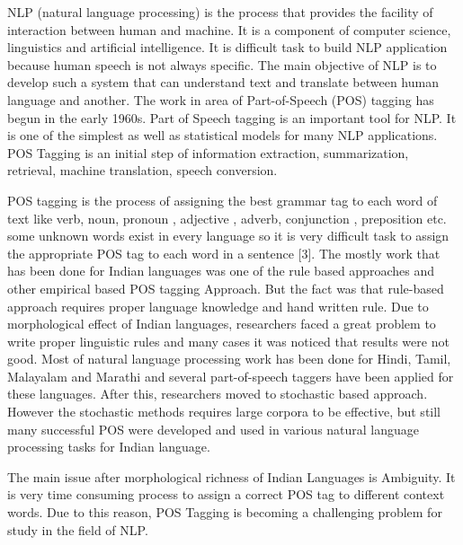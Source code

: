 \documentclass[12pt,a4paper,oneside]{memoir}
\begin{document}
NLP (natural language processing) is the process that provides the facility of interaction between human and machine. It is a component of computer science, linguistics and artificial intelligence. It is difficult task to build NLP application because human speech is not always specific. The main objective of NLP is to develop such a system that can understand text and translate between human language and another. The work in area of Part-of-Speech (POS) tagging has begun in the early 1960s. Part of Speech tagging is an important tool for NLP. It is one of the simplest as well as statistical models for many NLP applications. POS Tagging is an initial step of information extraction, summarization, retrieval, machine translation, speech conversion.

POS tagging is the process of assigning the best grammar tag to each word of text like verb, noun, pronoun , adjective , adverb, conjunction , preposition etc. some unknown words exist in every language so it is very difficult task to assign the appropriate POS tag to each word in a sentence [3]. The mostly work that has been done for Indian languages was one of the rule based approaches and other empirical based POS tagging Approach. But the fact was that rule-based approach requires proper language knowledge and hand written rule.  Due to morphological effect of Indian languages, researchers faced a great problem to write proper linguistic rules and many cases it was noticed that results were not good. Most of natural language processing work has been done for Hindi, Tamil, Malayalam and Marathi and several part-of-speech taggers have been applied for these languages. After this, researchers moved to stochastic based approach. However the stochastic methods requires  large corpora to be effective, but still many successful POS were developed and used in various natural language processing tasks for Indian language. 

The main issue after morphological richness of Indian Languages is Ambiguity. It is very time consuming process to assign a correct POS tag to different context words. Due to this reason, POS Tagging is becoming a challenging problem for study in the field of NLP.
\end{document}
